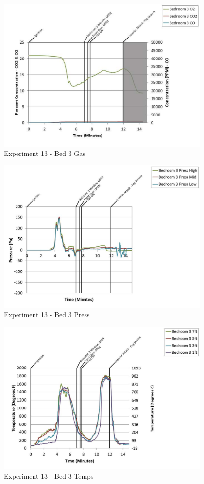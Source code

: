 \documentclass{article}
\begin{document}
\begin{appendices}
	\clearpage

	\begin{figure}[h!]
		\centering
		\includegraphics[height=3.05in]{0_Images/Results_Charts/Exp_13_Charts/Bed3Gas.pdf}
		\caption{Experiment 13 - Bed 3 Gas}
	\end{figure}
 

	\begin{figure}[h!]
		\centering
		\includegraphics[height=3.05in]{0_Images/Results_Charts/Exp_13_Charts/Bed3Press.pdf}
		\caption{Experiment 13 - Bed 3 Press}
	\end{figure}
 
	\clearpage

	\begin{figure}[h!]
		\centering
		\includegraphics[height=3.05in]{0_Images/Results_Charts/Exp_13_Charts/Bed3Temps.pdf}
		\caption{Experiment 13 - Bed 3 Temps}
	\end{figure}
 


\end{appendices}
\end{document}
